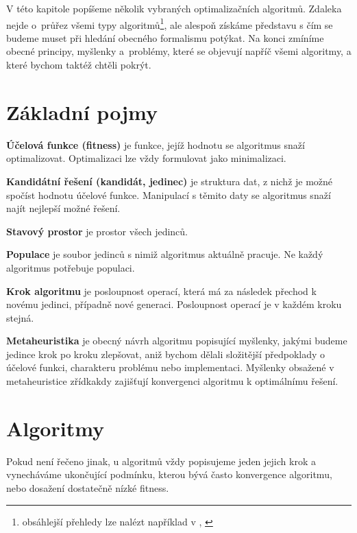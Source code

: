 
V této kapitole popíšeme několik vybraných optimalizačních algoritmů. Zdaleka nejde o~průřez všemi typy algoritmů\footnote{obsáhlejší přehledy lze nalézt například v \cite[p.~23]{GO ebook}, \cite{wiki metaheur}}, ale alespoň získáme představu s čím se budeme muset při hledání obecného formalismu potýkat. Na konci zmíníme obecné principy, myšlenky a~problémy, které se objevují napříč všemi algoritmy, a které bychom taktéž chtěli pokrýt.

\section{Základní pojmy}

\par{\textbf{Účelová funkce (fitness)} je funkce, jejíž hodnotu se algoritmus snaží optimalizovat. Optimalizaci lze vždy formulovat jako minimalizaci.}

\par{\textbf{Kandidátní řešení (kandidát, jedinec)} je struktura dat, z nichž je možné spočíst hodnotu účelové funkce. Manipulací s těmito daty se algoritmus snaží najít nejlepší možné řešení.}

\par{\textbf{Stavový prostor} je prostor všech jedinců.}

\par{\textbf{Populace} je soubor jedinců s nimiž algoritmus aktuálně pracuje. Ne každý algoritmus potřebuje populaci.}

\par{\textbf{Krok algoritmu} je posloupnost operací, která má za následek přechod k novému jedinci, případně nové generaci. Posloupnost operací je v každém kroku stejná.}

\par{\textbf{Metaheuristika} je obecný návrh algoritmu popisující myšlenky, jakými budeme jedince krok po kroku zlepšovat, aniž bychom dělali složitější předpoklady o účelové funkci, charakteru problému nebo implementaci. Myšlenky obsažené v metaheuristice zřídkakdy zajišťují konvergenci algoritmu k optimálnímu řešení.}

\section{Algoritmy}

Pokud není řečeno jinak, u algoritmů vždy popisujeme jeden jejich krok a vynecháváme ukončující podmínku, kterou bývá často konvergence algoritmu, nebo dosažení dostatečně nízké fitness.

